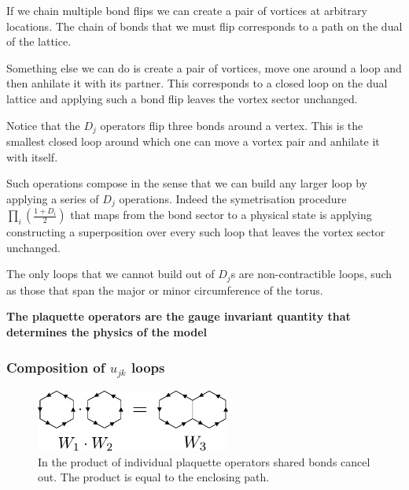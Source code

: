 If we chain multiple bond flips we can create a pair of vortices at
arbitrary locations. The chain of bonds that we must flip corresponds to
a path on the dual of the lattice.

Something else we can do is create a pair of vortices, move one around a
loop and then anhilate it with its partner. This corresponds to a closed
loop on the dual lattice and applying such a bond flip leaves the vortex
sector unchanged.

Notice that the \(D_j\) operators flip three bonds around a vertex. This
is the smallest closed loop around which one can move a vortex pair and
anhilate it with itself.

Such operations compose in the sense that we can build any larger loop
by applying a series of \(D_j\) operations. Indeed the symetrisation
procedure \(\prod_i \left( \frac{1 + D_i}{2}\right)\) that maps from the
bond sector to a physical state is applying constructing a superposition
over every such loop that leaves the vortex sector unchanged.

The only loops that we cannot build out of \(D_j\)s are non-contractible
loops, such as those that span the major or minor circumference of the
torus.

\textbf{The plaquette operators are the gauge invariant quantity that
determines the physics of the model}

\hypertarget{composition-of-u_jk-loops}{%
\subsubsection{\texorpdfstring{Composition of \(u_{jk}\)
loops}{Composition of u\_\{jk\} loops}}\label{composition-of-u_jk-loops}}

\begin{figure}
\hypertarget{fig:plaquette_addition_by_hand}{%
\centering
\includegraphics[width=0.57\textwidth,height=\textheight]{figure_code/amk_chapter/plaquette_addition/plaquette_addition_by_hand.pdf}
\caption{In the product of individual plaquette operators shared bonds
cancel out. The product is equal to the enclosing
path.}\label{fig:plaquette_addition_by_hand}
}
\end{figure}

